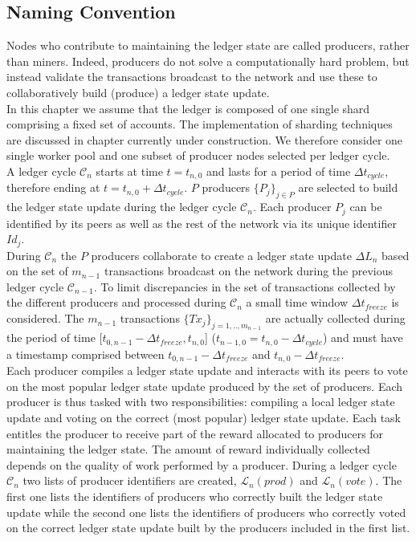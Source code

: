 \subsection{Naming Convention}

Nodes who contribute to maintaining the ledger state are called producers, rather than miners. Indeed, producers do not solve a computationally hard problem, but instead validate the transactions broadcast to the network and use these to collaboratively build (produce) a ledger state update. \\

In this chapter we assume that the ledger is composed of one single shard comprising a fixed set of accounts. The implementation of sharding techniques are discussed in chapter currently under construction.
We therefore consider one single worker pool and one subset of producer nodes selected per ledger cycle. \\

A ledger cycle $\mathcal{C}_n$ starts at time $t = t_{n,0}$ and lasts for a period of time $\Delta t_{cycle}$, therefore ending at $t = t_{n,0}+ \Delta t_{cycle}$. $P$ producers $\{P_j\}_{j\in P}$ are selected to build the ledger state update during the ledger cycle $\mathcal{C}_n$. Each producer $P_j$ can be identified by its peers as well as the rest of the network via its unique identifier $Id_j$.\\

During $\mathcal{C}_n$ the $P$ producers collaborate to create a ledger state update $\Delta L_{n}$ based on the set of $m_{n-1}$ transactions broadcast on the network during the previous ledger cycle $\mathcal{C}_{n-1}$. To limit discrepancies in the set of transactions collected by the different producers and processed during $\mathcal{C}_n$ a small time window $\Delta t_{freeze}$ is considered. The $m_{n-1}$ transactions $\{Tx_j\}_{j=1,..,m_{n-1}}$ are actually collected during the period of time [$t_{0,n-1} - \Delta t_{freeze}, t_{n,0}$] ($t_{n-1,0} = t_{n,0} - \Delta t_{cycle}$) and must have a timestamp comprised between $t_{0,n-1} - \Delta t_{freeze}$ and $t_{n,0} - \Delta t_{freeze}$.\\

Each producer compiles a ledger state update and interacts with its peers to vote on the most popular ledger state update produced by the set of producers. Each producer is thus tasked with two responsibilities: compiling a local ledger state update and voting on the correct (most popular) ledger state update. Each task entitles the producer to receive part of the reward allocated to producers for maintaining the ledger state. The amount of reward individually collected depends on the quality of work performed by a producer. During a ledger cycle $\mathcal{C}_n$ two lists of producer identifiers are created, $\mathcal{L}_n(prod)$ and $\mathcal{L}_n(vote)$. The first one lists the identifiers of producers who correctly built the ledger state update while the second one lists the identifiers of producers who correctly voted on the correct ledger state update built by the producers included in the first list.\\


